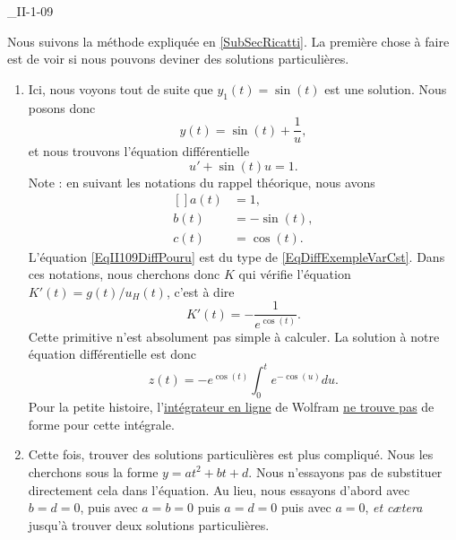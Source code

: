 

\begin{corrige}{_II-1-09}

Nous suivons la méthode expliquée en \ref{SubSecRicatti}. La première chose à faire est de voir si nous pouvons deviner des solutions particulières.

\begin{enumerate}

\item 
Ici, nous voyons tout de suite que $y_1(t)=\sin(t)$ est une solution. Nous posons donc
\begin{equation}
	y(t)=\sin(t)+\frac{1}{ u },
\end{equation}
et nous trouvons l'équation différentielle
\begin{equation}		\label{EqII109DiffPouru}
	u'+\sin(t)u=1.
\end{equation}
Note : en suivant les notations du rappel théorique, nous avons
\begin{equation}
	\begin{aligned}[]
		a(t)	&=1,\\
		b(t)	&=-\sin(t),\\
		c(t)	&=\cos(t).
	\end{aligned}
\end{equation}
L'équation \eqref{EqII109DiffPouru} est du type de \eqref{EqDiffExempleVarCst}. Dans ces notations, nous cherchons donc $K$ qui vérifie l'équation $K'(t)=g(t)/u_H(t)$, c'est à dire
\begin{equation}
	K'(t)=-\frac{ 1 }{  e^{\cos(t)} }.
\end{equation}
Cette primitive n'est absolument pas simple à calculer. La solution à notre équation différentielle est donc 
\begin{equation}
	z(t)=- e^{\cos(t)}\int_0^t e^{-\cos(u)}du.
\end{equation}
Pour la petite histoire, l'\href{http://integrals.wolfram.com/index.jsp}{intégrateur en ligne} de Wolfram \href{http://reference.wolfram.com/mathematica/tutorial/IntegralsThatCanAndCannotBeDone.html}{ne trouve pas} de forme pour cette intégrale.

\item Cette fois, trouver des solutions particulières est plus compliqué. Nous les cherchons sous la forme $y=at^2+bt+d$. Nous n'essayons pas de substituer directement cela dans l'équation. Au lieu, nous essayons d'abord avec $b=d=0$, puis avec $a=b=0$ puis $a=d=0$ puis avec $a=0$, \emph{et c\ae tera} jusqu'à trouver deux solutions particulières.


\end{enumerate}
\end{corrige}
